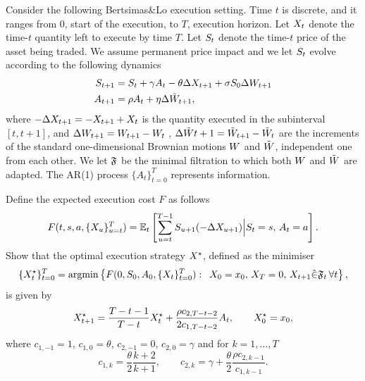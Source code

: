 \documentclass[10pt,a4paper]{article}
\begin{document}
\begin{exercise}
  \label{ex.ppinfo}
  Consider the following Bertsimas\&Lo execution setting. 
  Time $t$ is discrete, and it ranges from $0$, start of the execution, to $T$, execution horizon. 
  Let $X_t$ denote the time-$t$ quantity left to execute by time $T$. 
  Let $S_t$ denote the time-$t$ price of the asset being traded. 
  We assume permanent price impact and we let $S_t$ evolve according to the following dynamics
  \begin{equation*}
    \begin{split}
      S_{t+1} &= S_t +\gamma A_{t} - \theta\Delta X_{t+1} + \sigma S_0 \Delta W_{t+1}
      \\
      A_{t+1} &= \rho A_{t} + \eta \Delta\tilde{W}_{t+1},
    \end{split}
  \end{equation*}
  where $-\Delta X_{t+1} = - X_{t+1} + X_{t}$ is the quantity executed in the subinterval $[t, t+1]$, 
  and 
    $\Delta W_{t+1} = W_{t+1} - W_{t}$ ,
    $\Delta\tilde{W}{t+1} = \tilde{W}_{t+1} - \tilde{W}_{t}$
  are the increments of the standard one-dimensional Brownian motions
    $W$ and $\tilde{W}$, independent one from each other.  
    We let $\mathfrak{F}$ be the minimal filtration to which both  $W$ and $\tilde{W}$ are adapted. 
    The AR(1) process $\lbrace A_t \rbrace_{t=0}^{T}$ represents information. 

  Define the expected execution cost $F$ as follows
  \begin{equation*}  
    F(t,s,a,\lbrace X_{u}\rbrace_{u=t}^{T})
    =
    \mathbb{{E}}_{t} \left[
      \sum_{u=t}^{T-1} S_{u+1}(-\Delta X_{u+1}) \Big\vert 
      S_{t}=s, \, A_t = a
    \right].
  \end{equation*}
  Show that the optimal execution strategy $X^{\star}$, defined as the minimiser 
  \begin{equation*}
    \lbrace X^{\star}_t\rbrace_{t=0}^{T}
    =
    \mathrm{argmin}
    \left\lbrace
    F(0, S_0, A_0, \lbrace X_t\rbrace_{t=0}^{T}) :\,\,\,
    X_0 = x_0, \, 
    X_T = 0, \, 
    X_{t+1} \hat{\in} \mathfrak{F}_t \, \forall t
    \right\rbrace,
  \end{equation*}
  is given by 
  \begin{equation*}
    X^{\star}_{t+1} = 
    \frac{T-t-1}{T-t} X^{\star}_t
    + \frac{\rho c_{2, T-t-2}}{2 c_{1, T-t-2}}A_t,
    \qquad
    X^{\star}_0 = x_0, 
  \end{equation*}
  where $c_{1, -1} = 1 $, $c_{1, 0} = \theta$,  $c_{2, -1} = 0$, $c_{2,0} = \gamma$ and for $k=1, \dots, T$
  \begin{equation*}
    c_{1, k } = \frac{\theta}{2}\frac{k+2}{k+1},  \qquad
    c_{2,k} = \gamma + \frac{\theta}{2}\frac{\rho c_{2,k-1}}{c_{1,k-1}}.
  \end{equation*}
\end{exercise}
\end{document}
